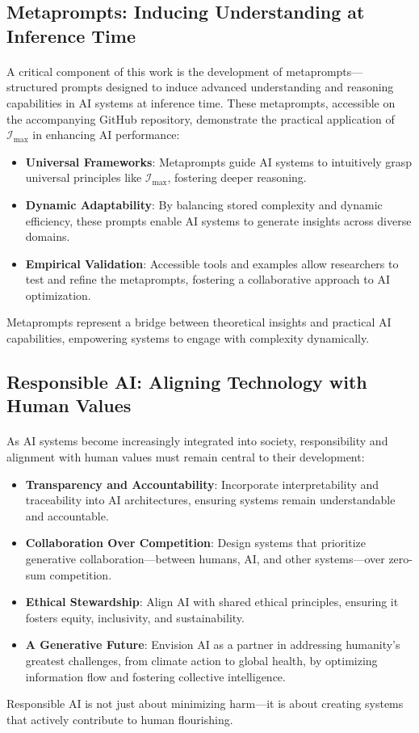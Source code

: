\documentclass[12pt]{article}
\begin{document}
\subsection{Metaprompts: Inducing Understanding at Inference Time}
\paragraph{}
A critical component of this work is the development of metaprompts—structured prompts designed to induce advanced understanding and reasoning capabilities in AI systems at inference time. These metaprompts, accessible on the accompanying GitHub repository, demonstrate the practical application of \(\mathcal{I}_{\text{max}}\) in enhancing AI performance:
\begin{itemize}
    \item \textbf{Universal Frameworks}: Metaprompts guide AI systems to intuitively grasp universal principles like \(\mathcal{I}_{\text{max}}\), fostering deeper reasoning.
    \item \textbf{Dynamic Adaptability}: By balancing stored complexity and dynamic efficiency, these prompts enable AI systems to generate insights across diverse domains.
    \item \textbf{Empirical Validation}: Accessible tools and examples allow researchers to test and refine the metaprompts, fostering a collaborative approach to AI optimization.
\end{itemize}
Metaprompts represent a bridge between theoretical insights and practical AI capabilities, empowering systems to engage with complexity dynamically.

\subsection{Responsible AI: Aligning Technology with Human Values}
\paragraph{}
As AI systems become increasingly integrated into society, responsibility and alignment with human values must remain central to their development:
\begin{itemize}
    \item \textbf{Transparency and Accountability}: Incorporate interpretability and traceability into AI architectures, ensuring systems remain understandable and accountable.
    \item \textbf{Collaboration Over Competition}: Design systems that prioritize generative collaboration—between humans, AI, and other systems—over zero-sum competition.
    \item \textbf{Ethical Stewardship}: Align AI with shared ethical principles, ensuring it fosters equity, inclusivity, and sustainability.
    \item \textbf{A Generative Future}: Envision AI as a partner in addressing humanity’s greatest challenges, from climate action to global health, by optimizing information flow and fostering collective intelligence.
\end{itemize}
Responsible AI is not just about minimizing harm—it is about creating systems that actively contribute to human flourishing.
\end{document}
